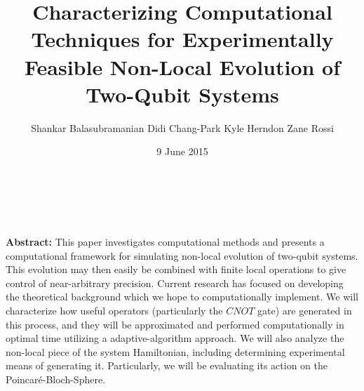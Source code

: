 \documentclass[12pt]{beamer}
\title{Characterizing Computational Techniques for Experimentally Feasible Non-Local Evolution of Two-Qubit Systems}
\author{Shankar Balasubramanian\hspace{1em} Didi Chang-Park\hspace{1em} Kyle Herndon\hspace{1em} Zane Rossi}
\institute{TJHSST Modern Physics and Optics Lab}
\date{9 June 2015}
\renewcommand{\maketitle}{%
	\begin{center}%
		\Huge\inserttitle\\[5mm]%
		\Large\insertauthor\\[5mm]%
		\Large\insertinstitute%
	\end{center}%
	\vspace*{-1.5ex}%
}
\begin{document}
\centering
	\begin{frame}{\maketitle}
	
					   {\bf{Abstract:}} This paper investigates computational methods and presents a computational framework for simulating non-local evolution of two-qubit systems. This evolution may then easily be combined with finite local operations to give control of near-arbitrary precision. Current research has focused on developing the theoretical background which we hope to computationally implement. We will characterize how useful operators (particularly the $CNOT$ gate) are generated in this process, and they will be approximated and performed computationally in optimal time utilizing a adaptive-algorithm approach. We will also analyze the non-local piece of the system Hamiltonian, including determining experimental means of generating it.  Particularly, we will be evaluating its action on the Poincar\'{e}-Bloch-Sphere.

\vfill

		\begin{columns}
			\begin{column}{.45\textwidth}
			

\end{column}
\end{columns}
\end{frame}
\end{document}

